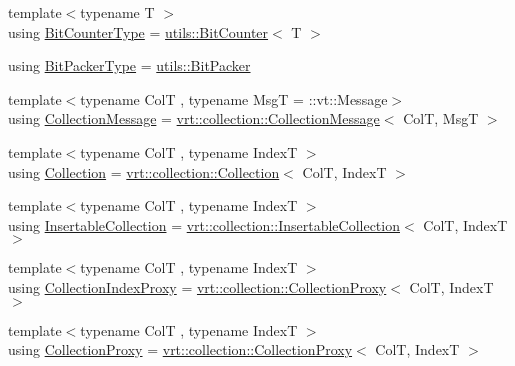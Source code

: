 \begin{DoxyCompactItemize}
\item 
{\footnotesize template$<$typename T $>$ }\\using \hyperlink{namespacevt_a34b3eb2eea8db3cf4ae27ced35b19b46}{Bit\+Counter\+Type} = \hyperlink{structvt_1_1utils_1_1_bit_counter}{utils\+::\+Bit\+Counter}$<$ T $>$
\item 
using \hyperlink{namespacevt_a80d5091925c65efd88ca7f49fe1d633b}{Bit\+Packer\+Type} = \hyperlink{structvt_1_1utils_1_1_bit_packer}{utils\+::\+Bit\+Packer}
\item 
{\footnotesize template$<$typename ColT , typename MsgT  = \+::vt\+::\+Message$>$ }\\using \hyperlink{namespacevt_ae7700e12f79c0fec16964aab84838428}{Collection\+Message} = \hyperlink{structvt_1_1vrt_1_1collection_1_1_collection_message}{vrt\+::collection\+::\+Collection\+Message}$<$ ColT, MsgT $>$
\item 
{\footnotesize template$<$typename ColT , typename IndexT $>$ }\\using \hyperlink{namespacevt_ac72e048964e4bb536faaa8bc90f58db7}{Collection} = \hyperlink{structvt_1_1vrt_1_1collection_1_1_collection}{vrt\+::collection\+::\+Collection}$<$ ColT, IndexT $>$
\item 
{\footnotesize template$<$typename ColT , typename IndexT $>$ }\\using \hyperlink{namespacevt_a7ffafd5682603cf80b1874f83cc7234f}{Insertable\+Collection} = \hyperlink{structvt_1_1vrt_1_1collection_1_1_insertable_collection}{vrt\+::collection\+::\+Insertable\+Collection}$<$ ColT, IndexT $>$
\item 
{\footnotesize template$<$typename ColT , typename IndexT $>$ }\\using \hyperlink{namespacevt_a2be17f5dafb626fe9f58d762b6aad2f0}{Collection\+Index\+Proxy} = \hyperlink{structvt_1_1vrt_1_1collection_1_1_collection_proxy}{vrt\+::collection\+::\+Collection\+Proxy}$<$ ColT, IndexT $>$
\item 
{\footnotesize template$<$typename ColT , typename IndexT $>$ }\\using \hyperlink{namespacevt_a0d58a693bfb96e0ce5d145692a1a1f98}{Collection\+Proxy} = \hyperlink{structvt_1_1vrt_1_1collection_1_1_collection_proxy}{vrt\+::collection\+::\+Collection\+Proxy}$<$ ColT, IndexT $>$
\end{DoxyCompactItemize}
